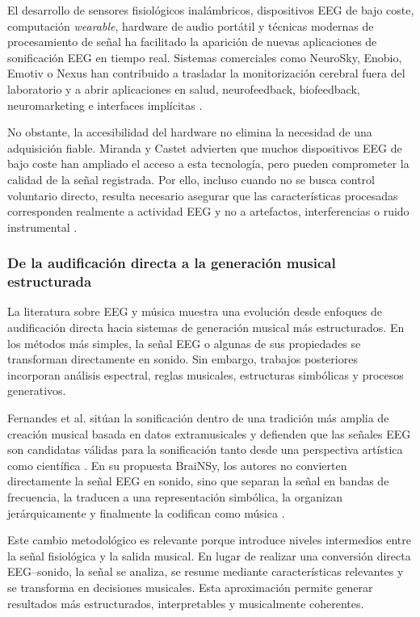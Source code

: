 \documentclass[../main.tex]{subfiles}
\begin{document}
El desarrollo de sensores fisiológicos inalámbricos, dispositivos EEG de bajo coste, computación \textit{wearable}, hardware de audio portátil y técnicas modernas de procesamiento de señal ha facilitado la aparición de nuevas aplicaciones de sonificación EEG en tiempo real. Sistemas comerciales como NeuroSky, Enobio, Emotiv o Nexus han contribuido a trasladar la monitorización cerebral fuera del laboratorio y a abrir aplicaciones en salud, neurofeedback, biofeedback, neuromarketing e interfaces implícitas \cite{Valjamae2013EEGSonification}.

No obstante, la accesibilidad del hardware no elimina la necesidad de una adquisición fiable. Miranda y Castet advierten que muchos dispositivos EEG de bajo coste han ampliado el acceso a esta tecnología, pero pueden comprometer la calidad de la señal registrada. Por ello, incluso cuando no se busca control voluntario directo, resulta necesario asegurar que las características procesadas corresponden realmente a actividad EEG y no a artefactos, interferencias o ruido instrumental \cite{MirandaCastet2014Preface}.

\subsubsection{De la audificación directa a la generación musical estructurada}

La literatura sobre EEG y música muestra una evolución desde enfoques de audificación directa hacia sistemas de generación musical más estructurados. En los métodos más simples, la señal EEG o algunas de sus propiedades se transforman directamente en sonido. Sin embargo, trabajos posteriores incorporan análisis espectral, reglas musicales, estructuras simbólicas y procesos generativos.

Fernandes et al. sitúan la sonificación dentro de una tradición más amplia de creación musical basada en datos extramusicales y defienden que las señales EEG son candidatas válidas para la sonificación tanto desde una perspectiva artística como científica \cite{Fernandes2021BraiNSy}. En su propuesta BraiNSy, los autores no convierten directamente la señal EEG en sonido, sino que separan la señal en bandas de frecuencia, la traducen a una representación simbólica, la organizan jerárquicamente y finalmente la codifican como música \cite{Fernandes2021BraiNSy}.

Este cambio metodológico es relevante porque introduce niveles intermedios entre la señal fisiológica y la salida musical. En lugar de realizar una conversión directa EEG--sonido, la señal se analiza, se resume mediante características relevantes y se transforma en decisiones musicales. Esta aproximación permite generar resultados más estructurados, interpretables y musicalmente coherentes.
\end{document}
